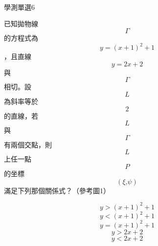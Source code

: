 \begin{QUESTIONS}
    \begin{QUESTION}
        \begin{ExamInfo}{85}{學測}{單選}{6}
        \end{ExamInfo}
        \begin{ExamAnsRateInfo}{}{}{}{}
        \end{ExamAnsRateInfo}
        \begin{QBODY}
            已知拋物線\[\Gamma \]的方程式為\[y={{\left( x+1 \right)}^{2}}+1\]，且直線\[y=2x+2\]與\[\Gamma \]相切。設\[L\]為斜率等於\[2\] 的直線，若\[L\]與\[\Gamma \]有兩個交點，則\[L\]上任一點\[P\]的坐標\[\left( \xi \text{,}\psi  \right)\]滿足下列那個關係式？（參考圖1）
            \begin{QOPS} 
 \QOP\[y>{{\left( x+1 \right)}^{2}}+1\]	
            \QOP\[y<{{\left( x+1 \right)}^{2}}+1\]
            \QOP\[y={{\left( x+1 \right)}^{2}}+1\]	
            \QOP\[y>2x+2\] 
            \QOP\[y<2x+2\]
            \end{QOPS}            
            

\end{QBODY}
\end{QUESTION}
\end{QUESTIONS}
